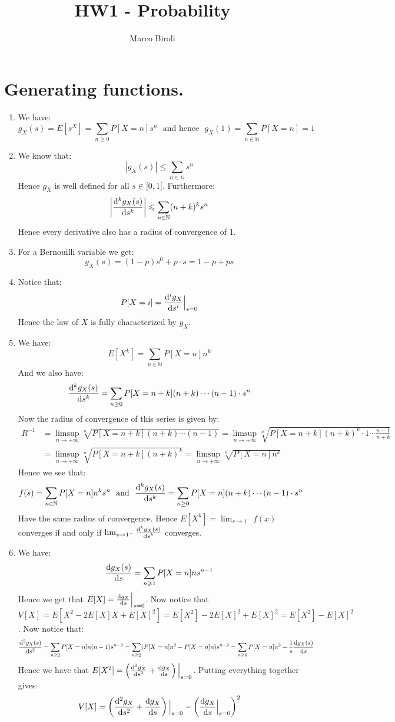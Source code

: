 \documentclass[10pt,a4paper]{article}
\author{Marco Biroli}
\title{HW1 - Probability}
\begin{document}
\maketitle

\section{Generating functions.}
\begin{enumerate}

\item We have:
\[
g_X(s) = E[s^X] = \sum_{n \geq 0} P[X = n]s^n \mbox{~~and hence~~} g_X(1) = \sum_{n \in \mathbb{N}} P[X = n] = 1
\]

\item We know that:
\[
|g_X(s)| \leqslant \sum_{n \in \mathbb{N}} s^n
\]
Hence $g_X$ is well defined for all $s \in [0, 1[$. Furthermore:
\[
\left|\dv[k]{g_X(s)}{s}\right| \leqslant \sum_{n \in \mathbb{N}} (n+k)^k s^{n}  
\] 
Hence every derivative also has a radius of convergence of 1. 

\item For a Bernouilli variable we get:
\[
g_X(s) = (1- p)s^0 + p \cdot s = 1 - p + p s
\]

\item Notice that:
\[
P[X = i] = \dv[i]{g_X}{s} \Big|_{s = 0}
\]
Hence the law of $X$ is fully characterized by $g_X$. 

\item We have:
\[
E[X^k] = \sum_{n \in \mathbb{N}} P[X = n] n^k 
\]
And we also have:
\[
\dv[k]{g_X(s)}{s} = \sum_{n \geq 0} P[X = n+k](n + k) \cdots (n - 1) \cdot  s^{n}
\]
Now the radius of convergence of this series is given by:
\begin{align*}
R^{-1} &= \limsup_{n \to +\infty} \sqrt[n]{P[X = n + k](n + k) \cdots (n - 1)} = \limsup_{n \to +\infty} \sqrt[n]{P[X = n + k] (n + k)^k \cdot 1 \cdots \frac{n - 1}{n + k}}  \\
&= \limsup_{n \to +\infty} \sqrt[n]{P[X = n + k](n + k)^k}  = \limsup_{n \to +\infty} \sqrt[n]{P[X = n]n^k} 
\end{align*}
Hence we see that:
\[
f(s) = \sum_{n \in \mathbb{N}} P[X = n]n^k s^n \mbox{~~and~~} \dv[k]{g_X(s)}{s} = \sum_{n \geq 0} P[X = n](n + k) \cdots (n - 1) \cdot  s^{n}
\]
Have the same radius of convergence. Hence $E[X^k] = \lim_{s \to 1^-} f(x)$ converges if and only if $\lim_{s \to 1^-} \dv[k]{g_X(s)}{s}$ converges.

\item We have:
\[
\dv{g_X(s)}{s} = \sum_{n \geqslant 1} P[X = n] n s^{n-1}
\]
Hence we get that $E[X] = \dv{g_X}{s}\Big|_{s = 0}$. Now notice that $V[X] = E[X^2 - 2 E[X] X + E[X]^2] = E[X^2] - 2 E[X]^2 + E[X]^2 = E[X^2] - E[X]^2$. Now notice that:
\[
\dv[2]{g_X(s)}{s} = \sum_{n \geq 2} P[X = n] n (n - 1) s^{n - 2} = \sum_{n \geq 2} (P[X = n]n^2 - P[X = n] n)s^{n - 2} = \sum_{n \geq 0} P[X = n]n^2 - \frac{1}{s}\dv{g_X(s)}{s}
\]
Hence we have that $E[X^2] = \left(\dv[2]{g_X}{s} + \dv{g_X}{s}\right)\Big|_{s = 0}$. Putting everything together gives:
\[
V[X] = \left(\dv[2]{g_X}{s} + \dv{g_X}{s}\right)\Big|_{s = 0} - \left( \dv{g_X}{s}\Big|_{s = 0} \right)^2
\]


\end{enumerate}
\end{document}
